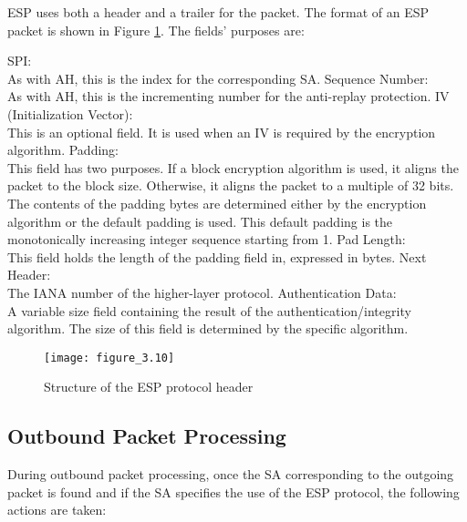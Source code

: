 ESP uses both a header and a trailer for the packet. The format of an ESP packet is shown in Figure \ref{fig:figure3.10}. The fields' purposes are:
\begin{outline}
\1 SPI: \\As with AH, this is the index for the corresponding SA.
\1 Sequence Number:\\ As with AH, this is the incrementing number for the anti-replay protection.
\1 IV (Initialization Vector):\\ This is an optional field. It is used when an IV is required by the encryption algorithm.
\1 Padding: \\ This field has two purposes. If a block encryption algorithm is used, it aligns the packet to the block size. Otherwise, it aligns the packet to a multiple of 32 bits. The contents of the padding bytes are determined either by the encryption algorithm or the default padding is used. This default padding is the monotonically increasing integer sequence starting from 1.
\1 Pad Length: \\ This field holds the length of the padding field in, expressed in bytes.
\1 Next Header: \\ The IANA number of the higher-layer protocol.
\1 Authentication Data: \\ A variable size field containing the result of the authentication/integrity algorithm. The size of this field is determined by the specific algorithm.
\end{outline}

\begin{figure}
\centering
\texttt{[image: figure\_3.10]}\\
\caption{ Structure of the ESP protocol header }
\label{fig:figure3.10}
\end{figure}

\subsection{Outbound Packet Processing}

During outbound packet processing, once the SA corresponding to the outgoing packet is found and if the SA specifies the use of the ESP protocol, the following actions are taken:

